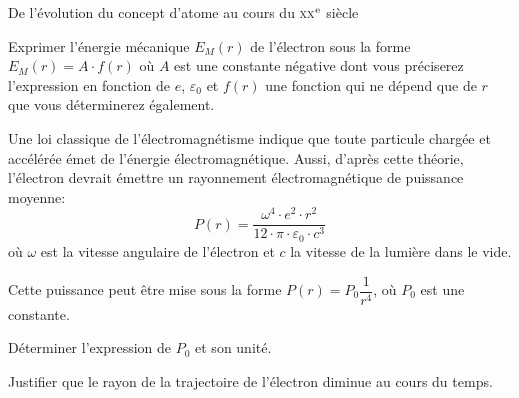 \begin{exo}[PC][1][devoir]{De l'évolution du concept d'atome au cours du \textsc{xx}$^{\rm e}$ siècle}
\begin{quest}
\item  Exprimer l'énergie mécanique $E_{M}(r)$ de l'électron sous la forme
$E_{M}(r)=A\cdot f(r)$ où $A$ est une constante négative dont vous
préciserez l'expression en fonction de $e$, $\varepsilon_{0}$ et
$f(r)$ une fonction qui ne dépend que de $r$ que vous déterminerez
également.


\item  Une loi classique de l'électromagnétisme indique que toute particule
chargée et accélérée émet de l'énergie électromagnétique. Aussi, d'après
cette théorie, l'électron devrait émettre un rayonnement électromagnétique
de puissance moyenne:
\[
P(r)=\dfrac{\omega^{4}\cdot e^{2}\cdot r^{2}}{12\cdot\pi\cdot\varepsilon_{0}\cdot c^{3}}
\]
où $\omega$ est la vitesse angulaire de l'électron et $c$ la vitesse
de la lumière dans le vide.


Cette puissance peut être mise sous la forme $P(r)=P_{0}\dfrac{1}{r^{4}}$,
où $P_{0}$ est une constante.


Déterminer l'expression de $P_{0}$ et son unité.


Justifier que le rayon de la trajectoire de l'électron diminue au
cours du temps.

\end{quest}
\end{exo}
